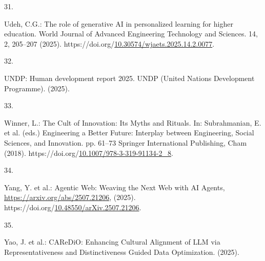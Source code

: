 \documentclass[
  letterpaper,
  DIV=11,
  numbers=noendperiod]{scrartcl}
\newlength{\cslhangindent}
\newlength{\csllabelwidth}
\newenvironment{CSLReferences}[2] %
 {\begin{list}{}{%
  \setlength{\itemindent}{0pt}
  \setlength{\leftmargin}{0pt}
  \setlength{\parsep}{0pt}
  \ifodd #1
   \setlength{\leftmargin}{\cslhangindent}
   \setlength{\itemindent}{-1\cslhangindent}
  \fi
  \setlength{\itemsep}{#2\baselineskip}}}
 {\end{list}}
\newcommand{\CSLLeftMargin}[1]{\parbox[t]{\csllabelwidth}{\strut#1\strut}}
\newcommand{\CSLRightInline}[1]{\parbox[t]{\linewidth - \csllabelwidth}{\strut#1\strut}}
\begin{document}
\begin{CSLReferences}{0}{0}
\CSLLeftMargin{31. }%
\CSLRightInline{Udeh, C.G.: The role of generative {AI} in personalized
learning for higher education. World Journal of Advanced Engineering
Technology and Sciences. 14, 2, 205--207 (2025).
https://doi.org/\href{https://doi.org/10.30574/wjaets.2025.14.2.0077}{10.30574/wjaets.2025.14.2.0077}.}

\CSLLeftMargin{32. }%
\CSLRightInline{UNDP: Human development report 2025. UNDP (United
Nations Development Programme). (2025).}

\CSLLeftMargin{33. }%
\CSLRightInline{Winner, L.: The {Cult} of {Innovation}: {Its Myths} and
{Rituals}. In: Subrahmanian, E. et al. (eds.) Engineering a {Better
Future}: {Interplay} between {Engineering}, {Social Sciences}, and
{Innovation}. pp. 61--73 Springer International Publishing, Cham (2018).
https://doi.org/\href{https://doi.org/10.1007/978-3-319-91134-2_8}{10.1007/978-3-319-91134-2\_8}.}

\CSLLeftMargin{34. }%
\CSLRightInline{Yang, Y. et al.: Agentic {Web}: {Weaving} the {Next Web}
with {AI Agents}, \url{https://arxiv.org/abs/2507.21206}, (2025).
https://doi.org/\href{https://doi.org/10.48550/arXiv.2507.21206}{10.48550/arXiv.2507.21206}.}

\CSLLeftMargin{35. }%
\CSLRightInline{Yao, J. et al.: {CAReDiO}: {Enhancing Cultural
Alignment} of {LLM} via {Representativeness} and {Distinctiveness Guided
Data Optimization}. (2025).}

\end{CSLReferences}
\end{document}
